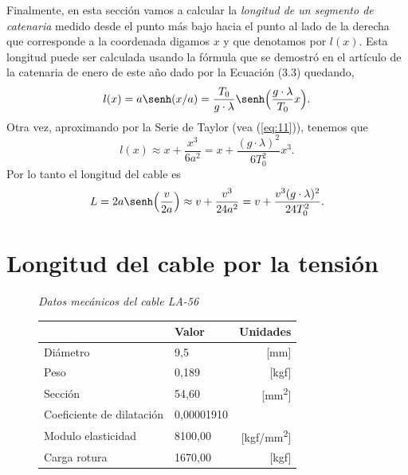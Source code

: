 Finalmente, en esta sección vamos a calcular la \emph{longitud de un
  segmento de catenaria} medido desde el punto más bajo hacia el punto
al lado de la derecha que corresponde a la coordenada digamos $x$ y
que denotamos por $l(x)$. Esta longitud puede ser calculada usando la
fórmula que se demostró en el artículo de la catenaria de enero de
este año dado por la Ecuación (3.3) quedando,
\begin{equation}
  \label{eq:3}
  l(x) = a\senh(x/a)=\frac{T_0}{g\cdot\lambda}\senh\Big(\frac{g\cdot\lambda}{T_0}x\Big).
\end{equation}
Otra vez, aproximando por la Serie de Taylor (vea (\ref{eq:11})),
tenemos que
\begin{equation}
  \label{eq:14}
  l(x) \approx{} x+\frac{x^3}{6a^2}=x+\frac{(g\cdot\lambda)^2}{6T_0^2}x^3.
\end{equation}
Por lo tanto el longitud del cable es
\begin{equation}
  \label{eq:15}
  L = 2a\senh\Big(\frac{v}{2a}\Big)\approx{} v + \frac{v^3}{24a^2} = v
  + \frac{v^3(g\cdot\lambda)^2}{24T_0^2}.
\end{equation}

\section{Longitud del cable por la tensión}
\label{sec:cable-y-la}

\begin{figure}
  \vspace{-1.5cm}
  \begin{mybox}
    \centering
    \emph{\textcolor{bluesol}{Datos mecánicos del cable LA-56}}
    
    \vspace{0.2cm}
    \begin{tabular}{llr}
      \toprule
      &Valor&Unidades\\
      \midrule
      Diámetro & 9,5 & [\si{mm}]\\
      Peso & 0,189& [\si{kgf}]\\
      Sección & 54,60 & [\si{mm^2}]\\
      Coeficiente de dilatación & 0,00001910 & \\
      Modulo elasticidad & 8100,00 & [\si{kgf/mm^2}]\\
      Carga rotura & 1670,00 & [\si{kgf}]\\
      \bottomrule
    \end{tabular}
  \end{mybox}
  \vspace{-1cm}
\end{figure}


